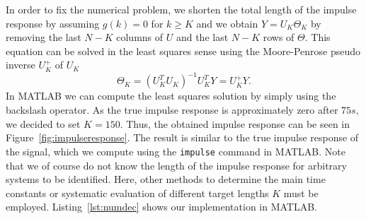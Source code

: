 \documentclass{scrartcl}
\newcommand{\matlabcode}[3]{\begin{figure}[h]\end{figure}}
\begin{document}
In order to fix the numerical problem, we shorten the total length of the impulse response by assuming $g(k) = 0$ for $k \geq K$ and we obtain $Y = U_{K} \Theta_{K}$ by removing the last $N-K$ columns of $U$ and the last $N-K$ rows of $\Theta$. 
This equation can be solved in the least squares sense using the Moore-Penrose pseudo inverse $U_{K}^+$ of $U_{K}$
\begin{equation}
	\Theta_{K} = (U^{T}_{K} U_{K})^{-1} U^{T}_{K} Y = U_{K}^{+} Y.
\end{equation}
In MATLAB we can compute the least squares solution by simply using the backslash operator.
As the true impulse response is approximately zero after $75 s$, we decided to set $K = 150$. Thus, the obtained impulse response can be seen in Figure~\ref{fig:impulseresponse}. The result is similar to the true impulse response of the signal, which we compute using the \verb|impulse| command in MATLAB.
Note that we of course do not know the length of the impulse response for arbitrary systems to be identified. 
Here, other methods to determine the main time constants or systematic evaluation of different target lengths $K$ must be employed.
Listing~\ref{lst:numdec} shows our implementation in MATLAB.

\matlabcode{../matlab/ce1/estimate_impulse_response_numdec.m}{Estimator of the impulse response via numerical deconvolution in MATLAB.}{lst:numdec}
\end{document}
